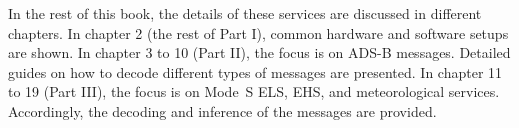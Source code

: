 In the rest of this book, the details of these services are discussed in different chapters. In chapter 2 (the rest of Part I), common hardware and software setups are shown. In chapter 3 to 10 (Part II), the focus is on ADS-B messages. Detailed guides on how to decode different types of messages are presented. In chapter 11 to 19 (Part III), the focus is on Mode~S ELS, EHS, and meteorological services. Accordingly, the decoding and inference of the messages are provided.
